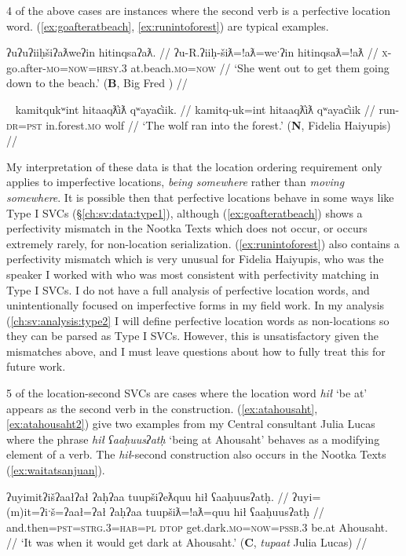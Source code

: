 4 of the above cases are instances where the second verb is a perfective location word. (\ref{ex:goafteratbeach}, \ref{ex:runintoforest}) are typical examples.

\ex \label{ex:goafteratbeach}
\begingl
\glpreamble ʔuʔuʔiiḥšiʔaƛweʔin hitinqsaʔaƛ. //
\gla ʔu-R.ʔiiḥ-šiƛ=!aƛ=weˑʔin hitinqsaƛ=!aƛ  //
\glb \textsc{x}-go.after-\textsc{mo}=\textsc{now}=\textsc{hrsy.3} at.beach.\textsc{mo}=\textsc{now} //
\glft `She went out to get them going down to the beach.' (\textbf{B}, Big Fred \citep[54]{sapir1939}) //
\endgl
\xe

\ex~ \label{ex:runintoforest}
\begingl
\glpreamble kamitqukʷint hitaaqƛ̓iƛ qʷayac̓iik. //
\gla kamitq-uk=int hitaaqƛ̓iƛ qʷayac̓iik  //
\glb run-\textsc{dr}=\textsc{pst} in.forest.\textsc{mo} wolf //
\glft `The wolf ran into the forest.' (\textbf{N}, Fidelia Haiyupis) //
\endgl
\xe

My interpretation of these data is that the location ordering requirement only applies to imperfective locations, \textit{being somewhere} rather than \textit{moving somewhere}. It is possible then that perfective locations behave in some ways like Type I SVCs (\S\ref{ch:sv:data:type1}), although (\ref{ex:goafteratbeach}) shows a perfectivity mismatch in the Nootka Texts which does not occur, or occurs extremely rarely, for non-location serialization. (\ref{ex:runintoforest}) also contains a perfectivity mismatch which is very unusual for Fidelia Haiyupis, who was the speaker I worked with who was most consistent with perfectivity matching in Type I SVCs. I do not have a full analysis of perfective location words, and unintentionally focused on imperfective forms in my field work. In my analysis (\ref{ch:sv:analysis:type2} I will define perfective location words as non-locations so they can be parsed as Type I SVCs. However, this is unsatisfactory given the mismatches above, and I must leave questions about how to fully treat this for future work.

5 of the location-second SVCs are cases where the location word \textit{hił} `be at' appears as the second verb in the construction. (\ref{ex:atahousaht}, \ref{ex:atahousaht2}) give two examples from my Central consultant Julia Lucas where the phrase \textit{hił ʕaaḥuusʔatḥ} `being at Ahousaht' behaves as a modifying element of a verb. The \textit{hił}-second construction also occurs in the Nootka Texts (\ref{ex:waitatsanjuan}).

\ex \label{ex:atahousaht}
\begingl
\glpreamble ʔuyimitʔišʔaałʔał ʔaḥʔaa tuupšiʔeƛquu hił ʕaaḥuusʔatḥ. //
\gla ʔuyi=(m)it=ʔiˑš=ʔaał=ʔał ʔaḥʔaa tuupšiƛ=!aƛ=quu hił ʕaaḥuusʔatḥ  //
\glb and.then=\textsc{pst}=\textsc{strg.3}=\textsc{hab}=\textsc{pl} \textsc{dtop} get.dark.\textsc{mo}=\textsc{now}=\textsc{pssb.3} be.at Ahousaht. //
\glft `It was when it would get dark at Ahousaht.' (\textbf{C}, \textit{tupaat} Julia Lucas) //
\endgl
\xe

